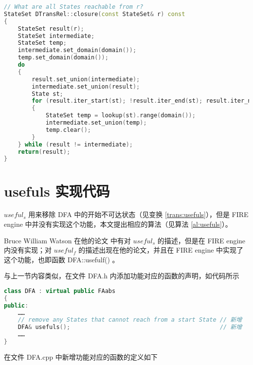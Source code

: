 \lstset{style=mystyle}
\begin{lstlisting}[language=C++,label={lst:SReachable-imp},caption={文件 DTransRel.cpp}]
// What are all States reachable from r?
StateSet DTransRel::closure(const StateSet& r) const
{
    StateSet result(r);
    StateSet intermediate;
    StateSet temp;
    intermediate.set_domain(domain());
    temp.set_domain(domain());
    do
    {
        result.set_union(intermediate);
        intermediate.set_union(result);
        State st;
        for (result.iter_start(st); !result.iter_end(st); result.iter_next(st))
        {
            StateSet temp = lookup(st).range(domain());
            intermediate.set_union(temp);
            temp.clear();
        }
    } while (result != intermediate);
    return(result);
}
\end{lstlisting}

\section{usefuls 实现代码}\label{sec:usefuls-imp}

$useful_s$ 用来移除 DFA 中的开始不可达状态（见变换 \ref{trans:usefuls}），但是 FIRE engine 中并没有实现这个功能，本文提出相应的算法（见算法 \ref{al:usefuls}）。

\begin{remark}
    Bruce William Watson 在他的论文 \cite{watson1993taxonomyb} 中有对 $useful_s$ 的描述，但是在 FIRE engine 内没有实现；对 $useful_f$ 的描述出现在他的论文\cite[注释 2.39]{watson1993taxonomya}，并且在 FIRE engine 中实现了这个功能，也即函数 DFA::usefulf() 。
\end{remark}

与上一节内容类似，在文件 DFA.h 内添加功能对应的函数的声明，如代码所示

\begin{lstlisting}[language=C++,label={lst:usefuls-def},caption={文件 DFA.h}]
class DFA : virtual public FAabs
{
public:
    ……
    // remove any States that cannot reach from a start State // 新增
	DFA& usefuls();                                           // 新增
    ……
}
\end{lstlisting}

在文件 DFA.cpp 中新增功能对应的函数的定义如下

